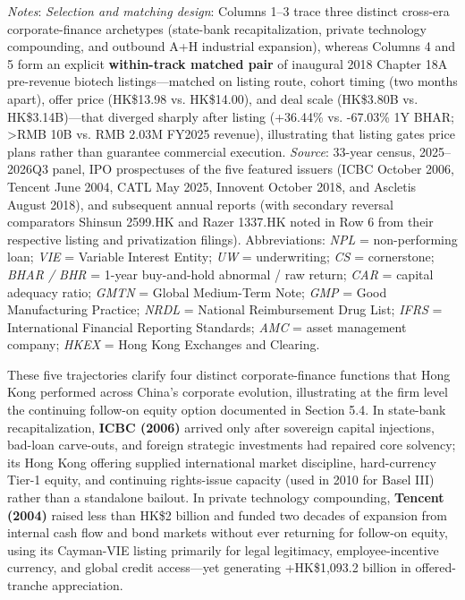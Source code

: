 \documentclass[11pt,letterpaper]{article}
\begin{document}
\begin{table}[!htbp]
\par\vspace{3pt}\noindent\parbox{\textwidth}{\scriptsize\raggedright \textit{Notes}: \textit{Selection and matching design}: Columns 1–3 trace three distinct cross-era corporate-finance archetypes (state-bank recapitalization, private technology compounding, and outbound A+H industrial expansion), whereas Columns 4 and 5 form an explicit \textbf{within-track matched pair} of inaugural 2018 Chapter 18A pre-revenue biotech listings—matched on listing route, cohort timing (two months apart), offer price (HK\$13.98 vs. HK\$14.00), and deal scale (HK\$3.80B vs. HK\$3.14B)—that diverged sharply after listing (+36.44\% vs. -67.03\% 1Y BHAR; \textgreater{}RMB 10B vs. RMB 2.03M FY2025 revenue), illustrating that listing gates price plans rather than guarantee commercial execution. \textit{Source}: 33-year census, 2025–2026Q3 panel, IPO prospectuses of the five featured issuers (ICBC October 2006, Tencent June 2004, CATL May 2025, Innovent October 2018, and Ascletis August 2018), and subsequent annual reports (with secondary reversal comparators Shinsun 2599.HK and Razer 1337.HK noted in Row 6 from their respective listing and privatization filings). Abbreviations: \textit{NPL} = non-performing loan; \textit{VIE} = Variable Interest Entity; \textit{UW} = underwriting; \textit{CS} = cornerstone; \textit{BHAR / BHR} = 1-year buy-and-hold abnormal / raw return; \textit{CAR} = capital adequacy ratio; \textit{GMTN} = Global Medium-Term Note; \textit{GMP} = Good Manufacturing Practice; \textit{NRDL} = National Reimbursement Drug List; \textit{IFRS} = International Financial Reporting Standards; \textit{AMC} = asset management company; \textit{HKEX} = Hong Kong Exchanges and Clearing.}
\end{table}

These five trajectories clarify four distinct corporate-finance functions that Hong Kong performed across China's corporate evolution, illustrating at the firm level the continuing follow-on equity option documented in Section 5.4. In state-bank recapitalization, \textbf{ICBC (2006)} arrived only after sovereign capital injections, bad-loan carve-outs, and foreign strategic investments had repaired core solvency; its Hong Kong offering supplied international market discipline, hard-currency Tier-1 equity, and continuing rights-issue capacity (used in 2010 for Basel III) rather than a standalone bailout. In private technology compounding, \textbf{Tencent (2004)} raised less than HK\$2 billion and funded two decades of expansion from internal cash flow and bond markets without ever returning for follow-on equity, using its Cayman-VIE listing primarily for legal legitimacy, employee-incentive currency, and global credit access—yet generating +HK\$1,093.2 billion in offered-tranche appreciation.
\end{document}
